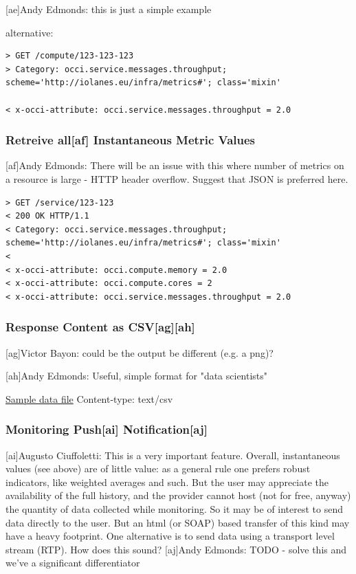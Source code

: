 \documentclass[12pt]{article}  %
\begin{document}
{
\color{blue}
[ae]Andy Edmonds:
this is just a simple example
}


alternative:
\begin{verbatim}
> GET /compute/123-123-123
> Category: occi.service.messages.throughput; scheme='http://iolanes.eu/infra/metrics#'; class='mixin'

< x-occi-attribute: occi.service.messages.throughput = 2.0
\end{verbatim}
\subsubsection{Retreive all[af] Instantaneous Metric Values}
{
\color{blue}
[af]Andy Edmonds:
There will be an issue with this where number of metrics on a resource  is large - HTTP header overflow. Suggest that JSON is preferred here.
}

\begin{verbatim}
> GET /service/123-123
< 200 OK HTTP/1.1
< Category: occi.service.messages.throughput; scheme='http://iolanes.eu/infra/metrics#'; class='mixin'
<
< x-occi-attribute: occi.compute.memory = 2.0
< x-occi-attribute: occi.compute.cores = 2
< x-occi-attribute: occi.service.messages.throughput = 2.0
\end{verbatim}

\subsubsection{Response Content as CSV[ag][ah]}

{
\color{blue}
[ag]Victor Bayon:
could be the output be different (e.g. a png)?

[ah]Andy Edmonds:
Useful, simple format for "data scientists"
}

\href{http://dl.dropbox.com/u/165239/sampleCSVData4OCCIMonitoringInterface.csv}{Sample data file} Content-type: text/csv

\subsubsection{Monitoring Push[ai] Notification[aj]}

{
\color{blue}
[ai]Augusto Ciuffoletti:
This is a very important feature. Overall, instantaneous values (see above) are of little value: as a general rule one prefers robust indicators, like weighted averages and such. But the user may appreciate the availability of the full history, and the provider cannot host (not for free, anyway) the quantity of data collected while monitoring. So it may be of interest to send data directly to the user. But an html (or SOAP) based transfer of this kind may have a heavy footprint. One alternative is to send data using a transport level stream (RTP). How does this sound?
[aj]Andy Edmonds:
TODO - solve this and we've a significant differentiator
}
\end{document}
